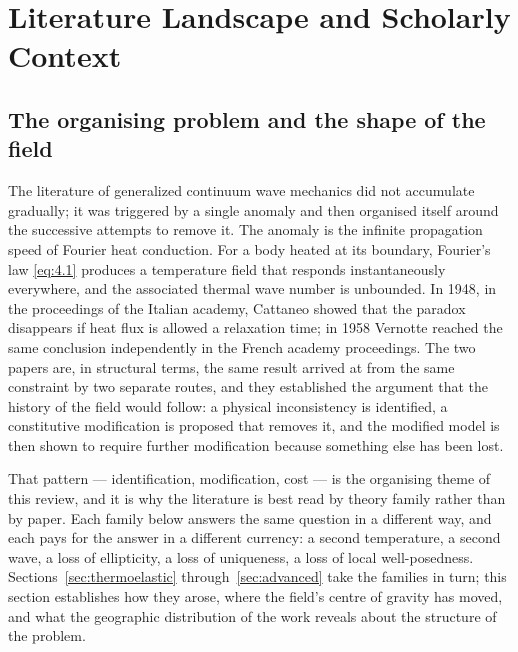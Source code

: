 \section{Literature Landscape and Scholarly Context}
\label{sec:literature}

\subsection{The organising problem and the shape of the field}

The literature of generalized continuum wave mechanics did not accumulate gradually; it was triggered by a single anomaly and then organised itself around the successive attempts to remove it. The anomaly is the infinite propagation speed of Fourier heat conduction. For a body heated at its boundary, Fourier's law \eqref{eq:4.1} produces a temperature field that responds instantaneously everywhere, and the associated thermal wave number is unbounded. In 1948, in the proceedings of the Italian academy, Cattaneo \cite{Cattaneo1948} showed that the paradox disappears if heat flux is allowed a relaxation time; in 1958 Vernotte \cite{Vernotte1958} reached the same conclusion independently in the French academy proceedings. The two papers are, in structural terms, the same result arrived at from the same constraint by two separate routes, and they established the argument that the history of the field would follow: a physical inconsistency is identified, a constitutive modification is proposed that removes it, and the modified model is then shown to require further modification because something else has been lost.

That pattern --- identification, modification, cost --- is the organising theme of this review, and it is why the literature is best read by theory family rather than by paper. Each family below answers the same question in a different way, and each pays for the answer in a different currency: a second temperature, a second wave, a loss of ellipticity, a loss of uniqueness, a loss of local well-posedness. Sections~\ref{sec:thermoelastic} through~\ref{sec:advanced} take the families in turn; this section establishes how they arose, where the field's centre of gravity has moved, and what the geographic distribution of the work reveals about the structure of the problem.

